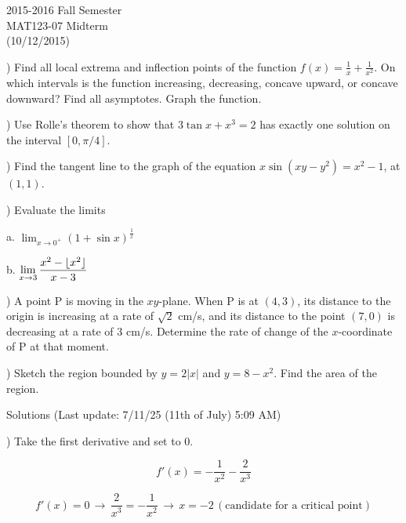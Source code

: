 \documentclass{article}
\DeclarePairedDelimiter\floor{\lfloor}{\rfloor}
\begin{document}
\large

\begin{center}
2015-2016 Fall Semester\\MAT123-07 Midterm\\(10/12/2015)
\end{center}

) Find all local extrema and inflection points of the function $f(x) = \frac{1}{x} + \frac{1}{x^2}$. On which intervals is the function increasing, decreasing, concave upward, or concave downward? Find all asymptotes. Graph the function.


\hfill

) Use Rolle's theorem to show that $3\tan x + x^3 = 2$ has exactly one solution on the interval $[0,\pi/4]$.

\hfill

) Find the tangent line to the graph of the equation $x \sin(xy-y^2) = x^2-1$, at $(1,1)$.

\hfill

) Evaluate the limits

a. $\displaystyle \lim_{x\to 0^+} (1+\sin x)^{\frac{1}{x}}$

b. $\displaystyle \lim_{x\to 3} \frac{x^2-\floor{x^2}}{x-3}$

\hfill

) A point P is moving in the $xy$-plane. When P is at $(4, 3)$, its distance to the origin is increasing at a rate of $\sqrt{2}$ cm/s, and its distance to the point $(7, 0)$ is decreasing at a rate of 3 cm/s. Determine the rate of change of the $x$-coordinate of P at that moment.

\hfill

) Sketch the region bounded by $y=2|x|$ and $y=8-x^2$. Find the area of the region.

\newpage

\begin{center}
Solutions (Last update: 7/11/25 (11th of July) 5:09 AM)
\end{center}

) Take the first derivative and set to 0.

\begin{equation*}f'(x) = -\frac{1}{x^2} - \frac{2}{x^3}\end{equation*}

\begin{equation*}f'(x) = 0\,\rightarrow\,\frac{2}{x^3} = -\frac{1}{x^2}\,\rightarrow\,x = -2 \, (\text{candidate for a critical point})\end{equation*}
\end{document}

